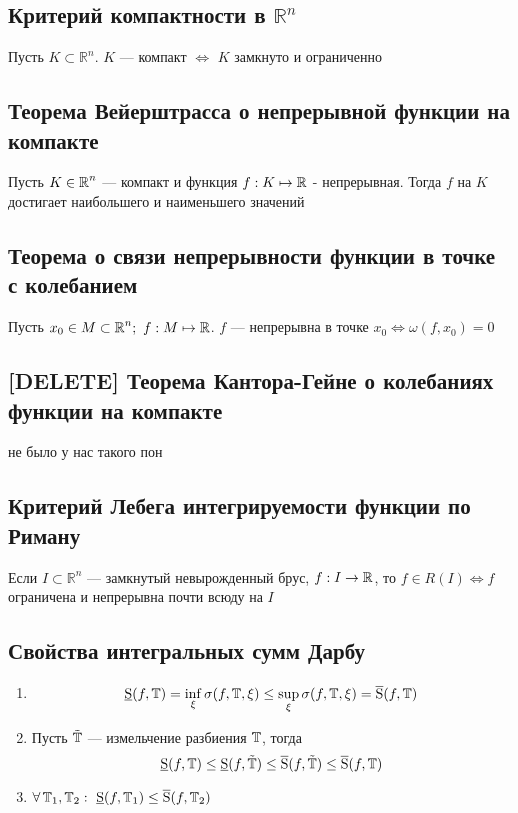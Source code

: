 \documentclass[a4paper]{article}
\begin{document}
\subsection{Критерий компактности в $\mathbb{R}^n$}
\theorem Пусть $K\subset \mathbb{R}^n$. $K$ — компакт $\Longleftrightarrow$ $K$ замкнуто и ограниченно

\subsection{Теорема Вейерштрасса о непрерывной функции на компакте}
\theorem Пусть $K\in \operatorname{\mathbb{R}}^n$ — компакт и функция $f: K\mapsto \operatorname{\mathbb{R}}$ - непрерывная. Тогда $f$ на $K$ достигает наибольшего и наименьшего значений

\subsection{Теорема о связи непрерывности функции в точке с колебанием}
\theorem Пусть $x_0 \in M \subset \operatorname{\mathbb{R}}^n; \,\, f: M\mapsto\operatorname{\mathbb{R}}$. $f$ — непрерывна в точке $x_0 \iff \omega(f, x_0) = 0$

\subsection{[DELETE] Теорема Кантора-Гейне о колебаниях функции на компакте}
не было у нас такого пон

\subsection{Критерий Лебега интегрируемости функции по Риману}
\theorem Если $I\subset \mathbb{R}^n$ — замкнутый невырожденный брус, $f: I\to\operatorname{\mathbb{R}}$, то $f\in R(I) \iff f$ ограничена и непрерывна почти всюду на $I$

\subsection{Свойства интегральных сумм Дарбу}
\begin{enumerate}
    \item \begin{equation*}
        \operatorname{\underline{S}}(f, \operatorname{\mathbb{T}}) = \inf_{\xi}\sigma(f, \operatorname{\mathbb{T}}, \xi) \le \sup_{\xi}\sigma(f, \operatorname{\mathbb{T}}, \xi) = \operatorname{\overline{S}}(f, \operatorname{\mathbb{T}})
    \end{equation*}

    \item Пусть $\tilde{\operatorname{\mathbb{T}}}$ — измельчение разбиения $\operatorname{\mathbb{T}}$, тогда
    \begin{equation*}
        \operatorname{\underline{S}}(f, \operatorname{\mathbb{T}}) \le \operatorname{\underline{S}}(f, \tilde{\operatorname{\mathbb{T}}}) \le \operatorname{\overline{S}}(f, \tilde{\operatorname{\mathbb{T}}}) \le \operatorname{\overline{S}}(f, \operatorname{\mathbb{T}})
    \end{equation*}

    \item $\forall \operatorname{\mathbb{T}}_1, \operatorname{\mathbb{T}}_2:\ \operatorname{\underline{S}}(f, \operatorname{\mathbb{T}}_1) \le \operatorname{\overline{S}}(f, \operatorname{\mathbb{T}}_2)$
\end{enumerate}
\end{document}
